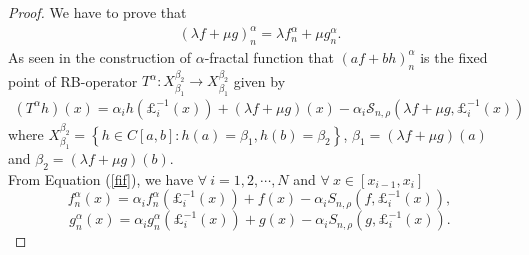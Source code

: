 \documentclass{article}[12pt, a4]
\begin{document}
	\begin{proof}
		We have to prove that 
		\begin{align*}
			(\lambda f+\mu g)_{n}^{\alpha}=\lambda f_{n}^{\alpha}+\mu g_{n}^{\alpha}.
		\end{align*}
		As seen in the construction of $\alpha$-fractal function that $(af+bh)_{n}^{\alpha}$ is the fixed point of RB-operator $T^{\alpha}:X_{\beta_1}^{\beta_2}\rightarrow X_{\beta_1}^{\beta_2}$  given by
		\begin{align}\label{t}
			(T^\alpha h)(x)=\alpha_{i}h(\pounds_{i}^{-1}(x))+(\lambda f+\mu g)(x)-\alpha_{i}\mathcal{S}_{n, \rho}(\lambda f+\mu g,\pounds_{i}^{-1}(x))
		\end{align} 
		where $X_{\beta_1}^{\beta_2}=\left\{h\in C[a,b]:h(a)=\beta_1, h(b)=\beta_2\right\}$, $\beta_1=(\lambda f+\mu g)(a)$ and $\beta_2=(\lambda f+\mu g)(b)$.\\
		From Equation (\ref{fif}), we have $\forall~ i =1,2,\cdots,N$ and $\forall~  x \in [x_{i-1},x_i]$
		\begin{equation} \label{f}
			f_{n}^{\alpha}(x)=\alpha_{i} f_{n}^{\alpha}\left(\pounds_{i}^{-1}(x)\right)+f(x)-\alpha_{i} S_{n,\rho}\left(f, \pounds_{i}^{-1}(x)\right),
		\end{equation}
		\begin{equation} \label{g}
			g_{n}^{\alpha}(x)=\alpha_{i} g_{n}^{\alpha}\left(\pounds_{i}^{-1}(x)\right)+g(x)-\alpha_{i} S_{n,\rho}\left(g, \pounds_{i}^{-1}(x)\right).
		\end{equation} 
		

\end{proof}
\end{document}
